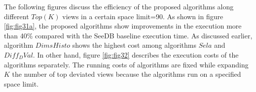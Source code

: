 The following figures discuss the efficiency of the proposed algorithms along different 
$Top(K)$ views in a certain space limit=90. As shown in figure 
\ref{fig:fig31a}, the proposed algorithms show improvements in the execution more 
than 40\% compared with the SeeDB baseline execution time. As discussed earlier, 
algorithm $DimsHisto$ shows the highest cost among algorithms $Sela$ and $Diff_DVal$. 
In other hand, figure \ref{fig:fig32} describes the execution costs of the algorithms separately. 
The running costs of algorithms are fixed while expanding $K$ the number of top deviated views 
because the algorithms run on a specified 
space limit.




 
